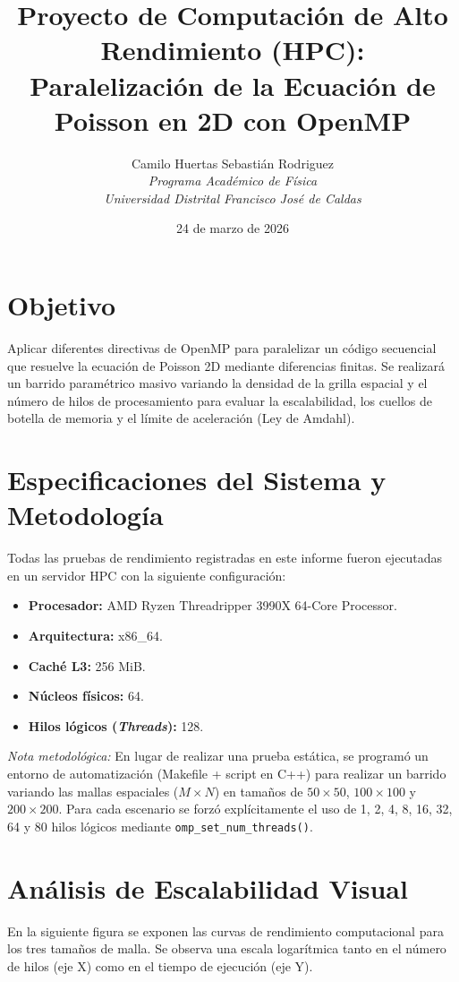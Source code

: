 \documentclass[11pt,a4paper]{article}
\title{\textbf{Proyecto de Computación de Alto Rendimiento (HPC): \\ Paralelización de la Ecuación de Poisson en 2D con OpenMP}}
\author{
    \begin{tabular}{c}
    Camilo Huertas \quad Sebastián Rodriguez \\
    \textit{Programa Académico de Física} \\
    \textit{Universidad Distrital Francisco José de Caldas} \\
    \end{tabular}
}
\date{24 de marzo de 2026}
\begin{document}
\maketitle

\section*{Objetivo}
Aplicar diferentes directivas de OpenMP para paralelizar un código secuencial que resuelve la ecuación de Poisson 2D mediante diferencias finitas. Se realizará un barrido paramétrico masivo variando la densidad de la grilla espacial y el número de hilos de procesamiento para evaluar la escalabilidad, los cuellos de botella de memoria y el límite de aceleración (Ley de Amdahl).

\section*{Especificaciones del Sistema y Metodología}
Todas las pruebas de rendimiento registradas en este informe fueron ejecutadas en un servidor HPC con la siguiente configuración:
\begin{itemize}
    \item \textbf{Procesador:} AMD Ryzen Threadripper 3990X 64-Core Processor.
    \item \textbf{Arquitectura:} x86\_64.
    \item \textbf{Caché L3:} 256 MiB.
    \item \textbf{Núcleos físicos:} 64.
    \item \textbf{Hilos lógicos (\textit{Threads}):} 128.
\end{itemize}

\textit{Nota metodológica:} En lugar de realizar una prueba estática, se programó un entorno de automatización (Makefile + script en C++) para realizar un barrido variando las mallas espaciales ($M \times N$) en tamaños de $50\times50$, $100\times100$ y $200\times200$. Para cada escenario se forzó explícitamente el uso de 1, 2, 4, 8, 16, 32, 64 y 80 hilos lógicos mediante \texttt{omp\_set\_num\_threads()}.

\section*{Análisis de Escalabilidad Visual}


En la siguiente figura se exponen las curvas de rendimiento computacional para los tres tamaños de malla. Se observa una escala logarítmica tanto en el número de hilos (eje X) como en el tiempo de ejecución (eje Y).
\end{document}
